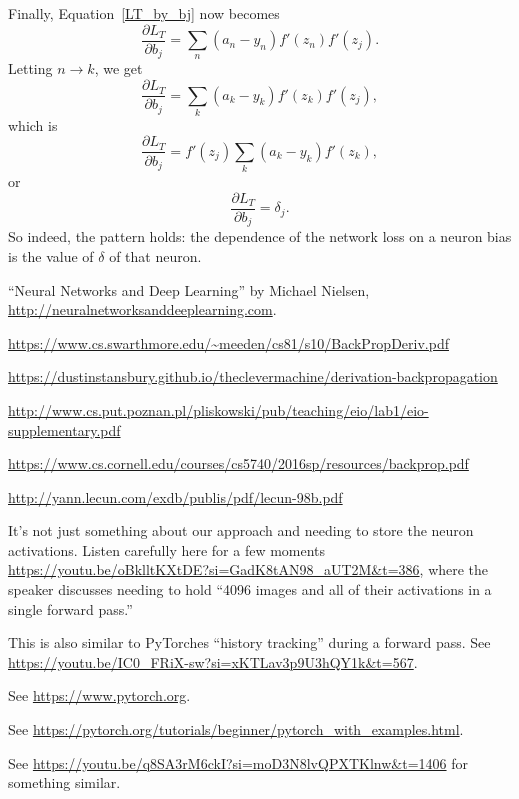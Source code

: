 \documentclass[12pt]{article}
\begin{document}
Finally, Equation~\ref{LT_by_bj} now becomes
\begin{equation}
\frac{\partial L_T}{\partial b_j}=\sum_n (a_n-y_n)f'(z_n)f'(z_j).
\end{equation}
Letting $n\rightarrow k$, we get
\begin{equation}
\frac{\partial L_T}{\partial b_j}=\sum_k (a_k-y_k)f'(z_k)f'(z_j),
\end{equation}
which is 
\begin{equation}
\frac{\partial L_T}{\partial b_j}=f'(z_j)\sum_k (a_k-y_k)f'(z_k),
\end{equation}
or 
\begin{equation}
\frac{\partial L_T}{\partial b_j}=\delta_j.
\end{equation}
So indeed, the pattern holds: the dependence of the network loss on a neuron bias is the value of $\delta$ of that  neuron. 





\begin{thebibliography}{99}

 ``Neural Networks and Deep Learning'' by Michael Nielsen, \url{http://neuralnetworksanddeeplearning.com}.

 \url{https://www.cs.swarthmore.edu/~meeden/cs81/s10/BackPropDeriv.pdf}

 \url{https://dustinstansbury.github.io/theclevermachine/derivation-backpropagation}

 \url{http://www.cs.put.poznan.pl/pliskowski/pub/teaching/eio/lab1/eio-supplementary.pdf}

 \url{https://www.cs.cornell.edu/courses/cs5740/2016sp/resources/backprop.pdf}

 \url{http://yann.lecun.com/exdb/publis/pdf/lecun-98b.pdf}

 It's not just something about our approach and needing to store the neuron activations.  Listen carefully here for a few moments \url{https://youtu.be/oBklltKXtDE?si=GadK8tAN98_aUT2M&t=386}, where the speaker discusses needing to hold ``4096 images and all of their activations in a single forward pass.''

 This is also similar to PyTorches ``history tracking'' during a forward pass.  See \url{https://youtu.be/IC0_FRiX-sw?si=xKTLav3p9U3hQY1k&t=567}.

 See \url{https://www.pytorch.org}.

 See \url{https://pytorch.org/tutorials/beginner/pytorch_with_examples.html}.

 See \url{https://youtu.be/q8SA3rM6ckI?si=moD3N8lvQPXTKlnw&t=1406} for something similar.

\end{thebibliography}
\end{document}
